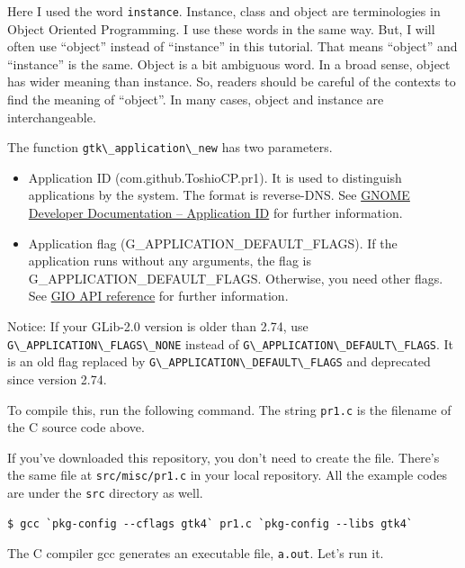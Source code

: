 Here I used the word \passthrough{\lstinline!instance!}. Instance, class
and object are terminologies in Object Oriented Programming. I use these
words in the same way. But, I will often use ``object'' instead of
``instance'' in this tutorial. That means ``object'' and ``instance'' is
the same. Object is a bit ambiguous word. In a broad sense, object has
wider meaning than instance. So, readers should be careful of the
contexts to find the meaning of ``object''. In many cases, object and
instance are interchangeable.

The function \passthrough{\lstinline!gtk\_application\_new!} has two
parameters.

\begin{itemize}
\item
  Application ID (com.github.ToshioCP.pr1). It is used to distinguish
  applications by the system. The format is reverse-DNS. See
  \href{https://developer.gnome.org/documentation/tutorials/application-id.html}{GNOME
  Developer Documentation -- Application ID} for further information.
\item
  Application flag (G\_APPLICATION\_DEFAULT\_FLAGS). If the application
  runs without any arguments, the flag is
  G\_APPLICATION\_DEFAULT\_FLAGS. Otherwise, you need other flags. See
  \href{https://docs.gtk.org/gio/flags.ApplicationFlags.html}{GIO API
  reference} for further information.
\end{itemize}

Notice: If your GLib-2.0 version is older than 2.74, use
\passthrough{\lstinline!G\_APPLICATION\_FLAGS\_NONE!} instead of
\passthrough{\lstinline!G\_APPLICATION\_DEFAULT\_FLAGS!}. It is an old
flag replaced by
\passthrough{\lstinline!G\_APPLICATION\_DEFAULT\_FLAGS!} and deprecated
since version 2.74.

To compile this, run the following command. The string
\passthrough{\lstinline!pr1.c!} is the filename of the C source code
above.

If you've downloaded this repository, you don't need to create the file.
There's the same file at \passthrough{\lstinline!src/misc/pr1.c!} in
your local repository. All the example codes are under the
\passthrough{\lstinline!src!} directory as well.

\begin{lstlisting}
$ gcc `pkg-config --cflags gtk4` pr1.c `pkg-config --libs gtk4`
\end{lstlisting}

The C compiler gcc generates an executable file,
\passthrough{\lstinline!a.out!}. Let's run it.

